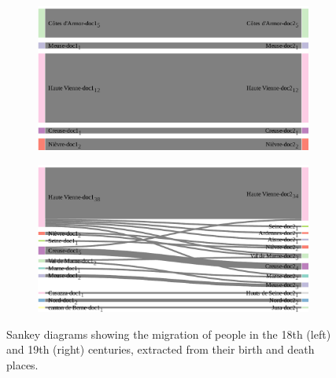 \begin{figure}[!ht]
    \centering

    \begin{subfigure}{0.49\linewidth}
    \includegraphics[width=\textwidth]{static/figures/ComBiNet/OriginalPaperFigures/CGF/frenchGenealogy/migration_18.pdf}
    \end{subfigure}
    \begin{subfigure}{0.49\linewidth}
    \includegraphics[width=\textwidth]{static/figures/ComBiNet/OriginalPaperFigures/CGF/frenchGenealogy/migration_19.pdf}
    \end{subfigure}

    \caption{Sankey diagrams showing the migration of people in the 18th (left) and 19th (right) centuries, extracted from their birth and death places.}\label{fig:useCaseNicole2}
\end{figure}


